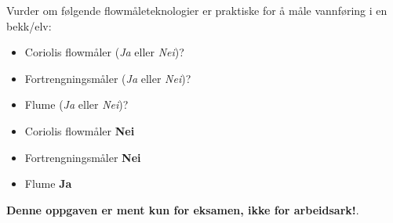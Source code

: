 

Vurder om følgende flowmåleteknologier er praktiske for å måle vannføring i en bekk/elv:

\begin{itemize}
\item{} Coriolis flowmåler ({\it Ja} eller {\it Nei})?
\vskip 10pt
\item{} Fortrengningsmåler ({\it Ja} eller {\it Nei})?
\vskip 10pt
\item{} Flume ({\it Ja} eller {\it Nei})?
\end{itemize}







\begin{itemize}
\item{} Coriolis flowmåler {\bf Nei}
\item{} Fortrengningsmåler {\bf Nei}
\item{} Flume {\bf Ja}
\end{itemize}







{\bf Denne oppgaven er ment kun for eksamen, ikke for arbeidsark!}.


